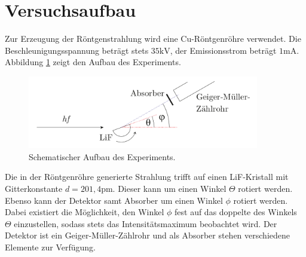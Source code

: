 \section{Versuchsaufbau}
\label{sec:Versuchaufbau}

Zur Erzeugung der Röntgenstrahlung wird eine Cu-Röntgenröhre verwendet. Die
Beschleunigungsspannung beträgt stets $35\si{\kilo\volt}$, der Emissionsstrom
beträgt $1\si{\milli\ampere}$. Abbildung \ref{fig:Aufbau} zeigt den Aufbau des
Experiments.
\begin{figure}
  \centering
  \includegraphics[width=0.9\textwidth]{ressources/Aufbau.pdf}
  \caption{Schematischer Aufbau des Experiments.}
  \label{fig:Aufbau}
\end{figure}
Die in der Röntgenröhre generierte Strahlung trifft auf einen LiF-Kristall mit
Gitterkonstante $d=201,4\si{\pico\meter}$. Dieser kann um einen Winkel $\Theta$
rotiert werden. Ebenso kann der Detektor samt Absorber um einen Winkel $\phi$
rotiert werden. Dabei existiert die Möglichkeit, den Winkel $\phi$ fest auf das doppelte des Winkels $\Theta$ einzustellen, sodass stets das Intensitätsmaximum beobachtet wird. Der Detektor ist ein Geiger-Müller-Zählrohr und als Absorber stehen verschiedene Elemente zur Verfügung.
